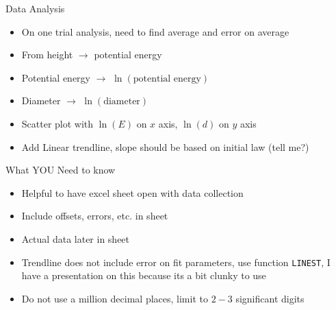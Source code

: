 \documentclass{beamer}
\begin{document}
\begin{frame}{Data Analysis}
  \begin{itemize}
  \item On one trial analysis, need to find average and error on average
  \item From height $\to$ potential energy
  \item Potential energy $\to$ $\ln(\text{potential energy})$
  \item Diameter $\to$ $\ln(\text{diameter})$
  \item Scatter plot with $\ln(E)$ on $x$ axis, $\ln(d)$ on $y$ axis
  \item Add Linear trendline, slope should be \underline{\qquad} based on initial law (tell me?)
  \end{itemize}
\end{frame}

\begin{frame}{What YOU Need to know}
  \begin{itemize}
  \item Helpful to have excel sheet open with data collection
  \item Include offsets, errors, etc. in sheet
  \item Actual data later in sheet
  \item Trendline does not include error on fit parameters, use function \texttt{LINEST}, I have a presentation on this because its a bit clunky to use
  \item Do not use a million decimal places, limit to $2-3$ significant digits
  \end{itemize}
\end{frame}
\end{document}

